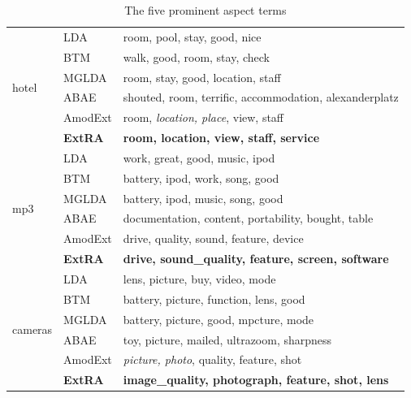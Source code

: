 \documentclass[11pt,a4paper]{article}
\begin{document}
\begin{table}[!th]
	\scriptsize
	\centering
	\caption{The five prominent aspect terms}
	\label{table:aspect_words}
	\begin{tabular}{|p{0.8cm}<{\centering}|p{0.75cm}<{\centering}|p{4.75cm}|}
		\hline
		\multirow{6}{*}{hotel} & LDA     & room, pool, stay, good, nice                           \\ \cline{2-3} 
		& BTM     & walk, good, room, stay, check                          \\ \cline{2-3} 
		& MGLDA   & room, stay, good, location, staff                      \\ \cline{2-3} 
		& ABAE    & shouted, room, terrific, accommodation, alexanderplatz \\ \cline{2-3} 
		& AmodExt & room, \textit{location, place}, view, staff                     \\ \cline{2-3} 
		& \textbf{ExtRA}   & \textbf{room, location, view, staff, service}                   \\ \hline
		\multirow{6}{*}{mp3}      & LDA     & work, great, good, music, ipod                         \\ \cline{2-3} 
		& BTM     & battery, ipod, work, song, good                        \\ \cline{2-3} 
		& MGLDA   & battery, ipod, music, song, good                       \\ \cline{2-3} 
		& ABAE    & documentation, content, portability, bought, table     \\ \cline{2-3} 
		& AmodExt & drive, quality, sound, feature, device                 \\ \cline{2-3} 
		& \textbf{ExtRA}   & \textbf{drive, sound\_quality, feature, screen, software}       \\ \hline
		\multirow{6}{*}{cameras}      & LDA     & lens, picture, buy, video, mode                        \\ \cline{2-3} 
		& BTM     & battery, picture, function, lens, good                 \\ \cline{2-3} 
		& MGLDA   & battery, picture, good, mpcture, mode                  \\ \cline{2-3} 
		& ABAE    & toy, picture, mailed, ultrazoom, sharpness             \\ \cline{2-3} 
		& AmodExt & \textit{picture, photo}, quality, feature, shot                 \\ \cline{2-3} 
		& \textbf{ExtRA}   & \textbf{image\_quality, photograph, feature, shot, lens}        \\ \hline

\end{tabular}
\end{table}
\end{document}
